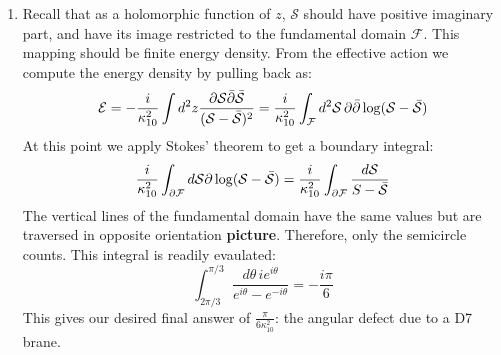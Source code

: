 \documentclass[11pt, class=article, crop=false]{standalone}
\begin{document}
\begin{enumerate}
	\item Recall that as a holomorphic function of $z$, $\mathcal S$ should have positive imaginary part, and have its image restricted to the fundamental domain $\mathcal F$. This mapping should be finite energy density. From the effective action we compute the energy density by pulling back as:
	\[
		\mathcal E = -\frac{i}{\kappa_{10}^2} \int d^2 z \frac{\partial \mathcal S \bar {\partial} \bar {\mathcal S}}{(\mathcal S - \bar {\mathcal S})^2} = \frac{i}{\kappa_{10}^2} \int_{\mathcal F} d^2 {\mathcal S} \, \partial \bar {\partial} \log(\mathcal S - \bar {\mathcal S})
	\]
	At this point we apply Stokes' theorem to get a boundary integral:
	\[
		\frac{i}{\kappa_{10}^2} \int_{\partial \mathcal F} d \mathcal S \partial \log(\mathcal S - \bar{\mathcal S}) = \frac{i}{\kappa_{10}^2} \int_{\partial \mathcal F} \frac{d \mathcal S}{S - \bar{\mathcal S}}
	\]
	The vertical lines of the fundamental domain have the same values but are traversed in opposite orientation \textbf{picture}. Therefore, only the semicircle counts. This integral is readily evaulated:
	\[
		\int_{2 \pi /3}^{\pi/3} \frac{d \theta\, i e^{i \theta}}{e^{i \theta} - e^{-i \theta}} = -\frac{i \pi}{6}
	\]
	This gives our desired final answer of $\frac{\pi}{6 \kappa_{10}^2}$: the angular defect due to a D7 brane.
	
\end{enumerate}

\end{document}
